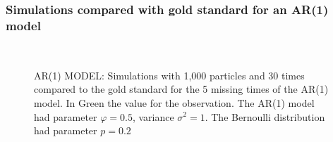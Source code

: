 \documentclass[9pt, xcolor={dvipsnames,svgnames,table}]{beamer}
\begin{document}
\begin{frame}
\frametitle{Simulations compared with gold standard for an AR(1) model}
\begin{figure}
    \captionsetup{font=footnotesize}
    \\
    \caption{AR(1) MODEL: Simulations with 1,000 particles and 30 times compared to the gold standard for the 5 missing times of the AR(1) model. In Green the value for the observation. The AR(1) model had parameter $\varphi = 0.5$, variance $\sigma^2 = 1$. The Bernoulli distribution had parameter $p = 0.2$}
\label{fig:1}
\end{figure}
\end{frame}
\end{document}
